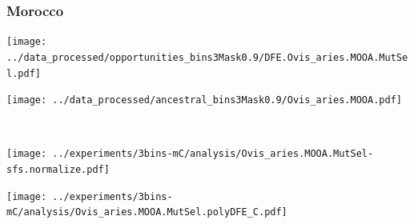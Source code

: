 \subsubsection{Morocco}

\begin{minipage}{0.49\linewidth}
    \texttt{[image: ../data\_processed/opportunities\_bins3Mask0.9/DFE.Ovis\_aries.MOOA.MutSel.pdf]}
\end{minipage}
\begin{minipage}{0.49\linewidth}
    \texttt{[image: ../data\_processed/ancestral\_bins3Mask0.9/Ovis\_aries.MOOA.pdf]}
\end{minipage}
\\
\begin{minipage}{0.49\linewidth}
    \texttt{[image: ../experiments/3bins-mC/analysis/Ovis\_aries.MOOA.MutSel-sfs.normalize.pdf]}
\end{minipage}
\begin{minipage}{0.49\linewidth}
    \texttt{[image: ../experiments/3bins-mC/analysis/Ovis\_aries.MOOA.MutSel.polyDFE\_C.pdf]}
\end{minipage}
\\

